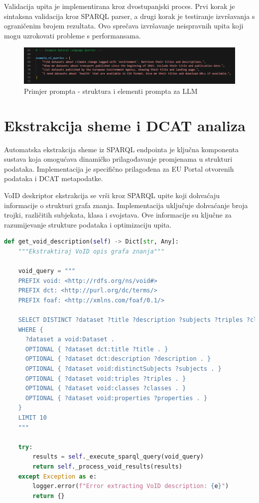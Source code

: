 Validacija upita je implementirana kroz dvostupanjski proces. Prvi korak je sintaksna validacija kroz SPARQL parser, a drugi korak je testiranje izvršavanja s ograničenim brojem rezultata. Ovo sprečava izvršavanje neispravnih upita koji mogu uzrokovati probleme s performansama.

\begin{figure}[htbp]
    \centering
    \includegraphics[width=1\textwidth]{figures/izvjestaj_image_84.png}
    \caption{Primjer prompta - struktura i elementi prompta za LLM}
    \label{fig:prompt_example}
\end{figure}

\section{Ekstrakcija sheme i DCAT analiza}

Automatska ekstrakcija sheme iz SPARQL endpointa je ključna komponenta sustava koja omogućava dinamičko prilagođavanje promjenama u strukturi podataka. Implementacija je specifično prilagođena za EU Portal otvorenih podataka i DCAT metapodatke.

VoID deskriptor ekstrakcija se vrši kroz SPARQL upite koji dohvaćaju informacije o strukturi grafa znanja. Implementacija uključuje dohvaćanje broja trojki, različitih subjekata, klasa i svojstava. Ove informacije su ključne za razumijevanje strukture podataka i optimizaciju upita.

\begin{lstlisting}[language=Python, caption=Implementacija VoID deskriptor ekstrakcije]
def get_void_description(self) -> Dict[str, Any]:
    """Ekstraktiraj VoID opis grafa znanja"""
    
    void_query = """
    PREFIX void: <http://rdfs.org/ns/void#>
    PREFIX dct: <http://purl.org/dc/terms/>
    PREFIX foaf: <http://xmlns.com/foaf/0.1/>
    
    SELECT DISTINCT ?dataset ?title ?description ?subjects ?triples ?classes ?properties
    WHERE {
      ?dataset a void:Dataset .
      OPTIONAL { ?dataset dct:title ?title . }
      OPTIONAL { ?dataset dct:description ?description . }
      OPTIONAL { ?dataset void:distinctSubjects ?subjects . }
      OPTIONAL { ?dataset void:triples ?triples . }
      OPTIONAL { ?dataset void:classes ?classes . }
      OPTIONAL { ?dataset void:properties ?properties . }
    }
    LIMIT 10
    """
    
    try:
        results = self._execute_sparql_query(void_query)
        return self._process_void_results(results)
    except Exception as e:
        logger.error(f"Error extracting VoID description: {e}")
        return {}
\end{lstlisting}

